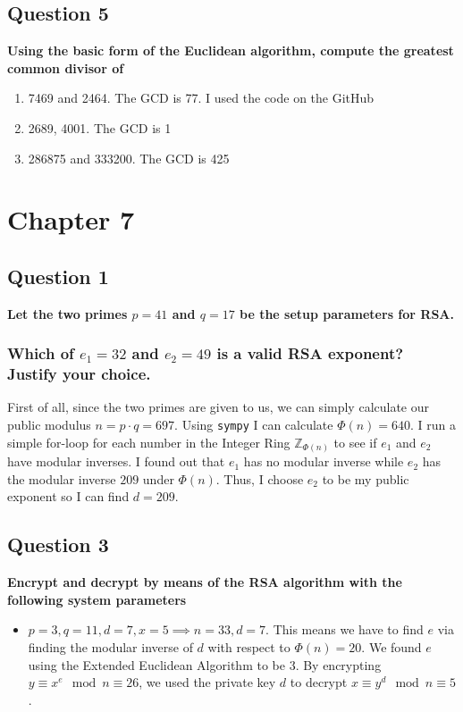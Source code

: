 \documentclass[titlepage]{article}
\begin{document}
{\subsection{Question 5}
{
\textbf{Using the basic form of the Euclidean algorithm, compute the greatest common divisor of}
\begin{enumerate}
    \item 7469 and 2464. The GCD is 77. I used the code on the GitHub
    \item 2689, 4001. The GCD is 1
    \item 286875 and 333200. The GCD is 425
\end{enumerate}
}
}
\clearpage
\section{Chapter 7}
{
\subsection{Question 1}
{
\textbf{Let the two primes \(p = 41\) and \(q = 17\) be the setup parameters for RSA.}
\subsubsection{Which of \(e_1 = 32\) and \(e_2 = 49\) is a valid RSA exponent? Justify your choice.}
{
First of all, since the two primes are given to us, we can simply calculate our public modulus \(n = p \cdot q = 697\). Using \texttt{sympy} I can calculate \(\Phi(n) = 640\). I run a simple for-loop for each number in the Integer Ring \(\mathbb{Z}_{\Phi(n)}\) to see if \(e_1\) and \(e_2\) have modular inverses. I found out that \(e_1\) has no modular inverse while \(e_2\) has the modular inverse \(209\) under \(\Phi(n)\). Thus, I choose \(e_2\) to be my public exponent so I can find \(d = 209\).
}
}
\subsection{Question 3}
{
\textbf{Encrypt and decrypt by means of the RSA algorithm with the following system parameters}
\begin{itemize}
    \item \(p = 3, q = 11, d = 7, x = 5 \implies n = 33, d = 7\). This means we have to find \(e\) via finding the modular inverse of \(d\) with respect to \(\Phi(n) = 20\). We found \(e\) using the Extended Euclidean Algorithm to be \(3\). By encrypting \(y \equiv x^e \mod n \equiv 26\), we used the private key \(d\) to decrypt \(x \equiv y^d \mod n \equiv 5\). 
\end{itemize}
}
}
\end{document}
